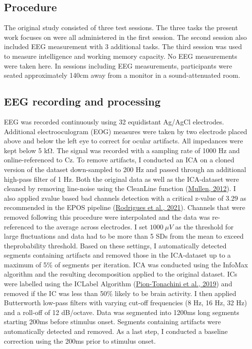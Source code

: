 \documentclass[
  man]{apa7}
\begin{document}
\hypertarget{procedure}{%
\subsection{Procedure}\label{procedure}}

The original study consisted of three test sessions. The three tasks the present work focuses on were all administered in the first session. The second session also included EEG measurement with 3 additional tasks. The third session was used to measure intelligence and working memory capacity. No EEG measurements were taken here. In sessions including EEG measurements, participants were seated approximately 140cm away from a monitor in a sound-attenuated room.

\hypertarget{eeg-recording-and-processing}{%
\subsection{EEG recording and processing}\label{eeg-recording-and-processing}}

EEG was recorded continuously using 32 equidistant Ag/AgCl electrodes. Additional electrooculogram (EOG) measures were taken by two electrode placed above and below the left eye to correct for ocular artifacts. All impedances were kept below 5 kΩ. The signal was recorded with a sampling rate of 1000 Hz and online-referenced to Cz. To remove artifacts, I conducted an ICA on a cloned version of the dataset down-sampled to 200 Hz and passed through an additional high-pass filter of 1 Hz. Both the original data as well as the ICA-dataset were cleaned by removing line-noise using the CleanLine function (\protect\hyperlink{ref-mullen2012cleanline}{Mullen, 2012}). I also applied zvalue based bad channels detection with a critical z-value of 3.29 as recommended in the EPOS pipeline (\protect\hyperlink{ref-rodrigues2021epos}{Rodrigues et al., 2021}). Channels that were removed following this procedure were interpolated and the data was re-referenced to the average across electrodes. I set \(1000 \ \mu V\) as the threshold for large fluctuations and data had to be more than 5 SDs from the mean to exceed theprobability threshold. Based on these settings, I automatically detected segments containing artifacts and removed those in the ICA-dataset up to a maximum of 5\% of segments per iteration. ICA was conducted using the InfoMax algorithm and the resulting decomposition applied to the original dataset. ICs were labelled using the ICLabel Algorithm (\protect\hyperlink{ref-pion2019iclabel}{Pion-Tonachini et al., 2019}) and removed if the IC was less than 50\% likely to be brain activity. I then applied Butterworth low-pass filters with varying cut-off frequencies (8 Hz, 16 Hz, 32 Hz) and a roll-off of 12 dB/octave. Data was segmented into 1200ms long segments starting 200ms before stimulus onset. Segments containing artifacts were automatically detected and removed. As a last step, I conducted a baseline correction using the 200ms prior to stimulus onset.
\end{document}
